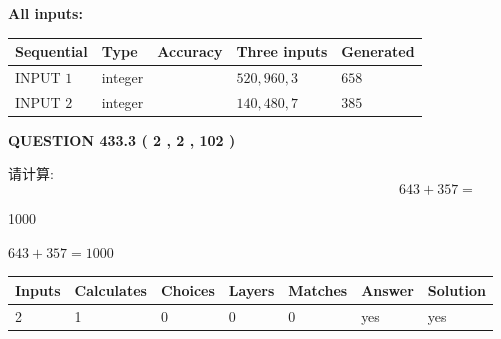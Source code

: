 \documentclass{ctexart}
\begin{document}
   
   
   
\noindent\vspace{0.1in}\hspace{-0.08in} {\textbf{\Large{All inputs: }}}
   
   
  
  
\noindent\begin{tabular}{|l|l|l|l|l|}
\hline
 Sequential & Type & Accuracy & Three inputs & Generated \\ 
\hline
 
 
  INPUT $  1 $ & integer &  & $
 520
 , 
 960
 , 
 3
 $ & $ 658 $ 
 \\  \hline  
 
 
  INPUT $  2 $ & integer &  & $
 140
 , 
 480
 , 
 7
 $ & $ 385 $ 
 \\  \hline  
 \end{tabular}
   
   
  
\vspace{0.2in}
  
{\textbf{\Large{QUESTION
433.3 
 ( 2 , 2 , 102 )
}}}
  
  
 
请计算:
\begin{equation}
643 +  %
357 = \nonumber
\end{equation}
 
 
 
\noindent{}
 
 

1000
 
 
\noindent{}
 
 

 
 
 
\noindent{}
 
 

$ %
643 +  %
357=   %
1000$
 
 
\noindent{}
 
 

 
   
   
   
   
\noindent\begin{tabular}{|l|l|l|l|l|l|l|}
 \hline
Inputs & Calculates & Choices & Layers & Matches & Answer & Solution \\ \hline
 2  & 
 1  & 
 0
  & 
 0  & 
 0  & 
  yes & 
  yes 
  \\ \hline
 \end{tabular}
   
\end{document}
